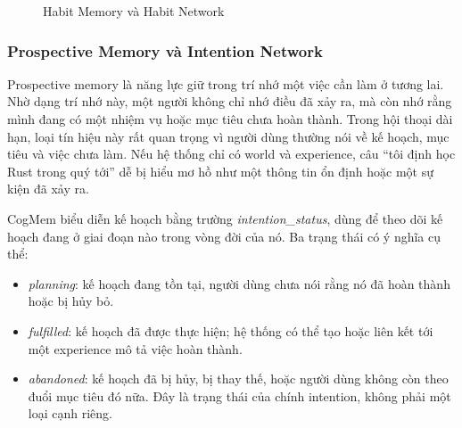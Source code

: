 \documentclass[../main.tex]{subfiles}
\begin{document}
\begin{figure}[H]
\centering
{}
\caption{Habit Memory và Habit Network}
\label{fig:ch4_habit_memory}
\end{figure}

\subsubsection{Prospective Memory và Intention Network}

Prospective memory là năng lực giữ trong trí nhớ một việc cần làm ở tương lai. Nhờ dạng trí nhớ này, một người không chỉ nhớ điều đã xảy ra, mà còn nhớ rằng mình đang có một nhiệm vụ hoặc mục tiêu chưa hoàn thành. Trong hội thoại dài hạn, loại tín hiệu này rất quan trọng vì người dùng thường nói về kế hoạch, mục tiêu và việc chưa làm. Nếu hệ thống chỉ có world và experience, câu ``tôi định học Rust trong quý tới'' dễ bị hiểu mơ hồ như một thông tin ổn định hoặc một sự kiện đã xảy ra.

CogMem biểu diễn kế hoạch bằng trường \textit{intention\_status}, dùng để theo dõi kế hoạch đang ở giai đoạn nào trong vòng đời của nó. Ba trạng thái có ý nghĩa cụ thể:

\begin{itemize}
    \item \textit{planning}: kế hoạch đang tồn tại, người dùng chưa nói rằng nó đã hoàn thành hoặc bị hủy bỏ.
    \item \textit{fulfilled}: kế hoạch đã được thực hiện; hệ thống có thể tạo hoặc liên kết tới một experience mô tả việc hoàn thành.
    \item \textit{abandoned}: kế hoạch đã bị hủy, bị thay thế, hoặc người dùng không còn theo đuổi mục tiêu đó nữa. Đây là trạng thái của chính intention, không phải một loại cạnh riêng.
\end{itemize}
\end{document}
